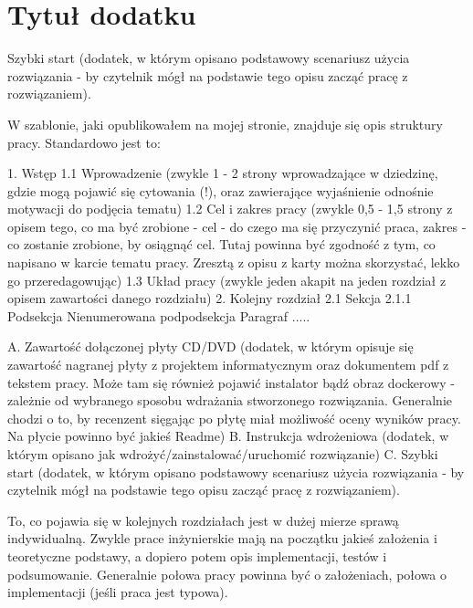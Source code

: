 \chapter{Tytuł dodatku}
Szybki start (dodatek, w którym opisano podstawowy scenariusz użycia rozwiązania - by czytelnik mógł na podstawie tego opisu zacząć pracę z rozwiązaniem).

W szablonie, jaki opublikowałem na mojej stronie, znajduje się opis struktury pracy. Standardowo jest to:

    1. Wstęp
        1.1 Wprowadzenie
            (zwykle 1 - 2 strony wprowadzające w dziedzinę, gdzie mogą pojawić się cytowania (!), oraz zawierające wyjaśnienie odnośnie motywacji do podjęcia tematu)
        1.2 Cel i zakres pracy
            (zwykle 0,5 - 1,5 strony z opisem tego, co ma być zrobione - cel - do czego ma się przyczynić praca, zakres - co zostanie zrobione, by osiągnąć cel. Tutaj powinna być zgodność z tym, co napisano w karcie tematu pracy. Zresztą  z opisu z karty można skorzystać, lekko go przeredagowując)
        1.3 Układ pracy
            (zwykle jeden akapit na jeden rozdział z opisem zawartości danego rozdziału)
    2. Kolejny rozdział
        2.1 Sekcja
        2.1.1 Podsekcja
            Nienumerowana podpodsekcja
                Paragraf
     .....

    A. Zawartość dołączonej płyty CD/DVD
        (dodatek, w którym opisuje się zawartość nagranej płyty z projektem informatycznym oraz dokumentem pdf z tekstem pracy. Może tam się również pojawić instalator bądź obraz dockerowy - zależnie od wybranego sposobu wdrażania stworzonego rozwiązania. Generalnie chodzi o to, by recenzent sięgając po płytę miał możliwość oceny wyników pracy. Na płycie powinno być jakieś Readme)
    B. Instrukcja wdrożeniowa (dodatek, w którym opisano jak wdrożyć/zainstalować/uruchomić rozwiązanie)
    C. Szybki start (dodatek, w którym opisano podstawowy scenariusz użycia rozwiązania - by czytelnik mógł na podstawie tego opisu zacząć pracę z rozwiązaniem).

To, co pojawia się w kolejnych rozdziałach jest w dużej mierze sprawą indywidualną. Zwykle prace inżynierskie mają na początku jakieś założenia i teoretyczne podstawy, a dopiero potem opis implementacji, testów i podsumowanie. Generalnie połowa pracy powinna być o założeniach, połowa o implementacji (jeśli praca jest typowa).

